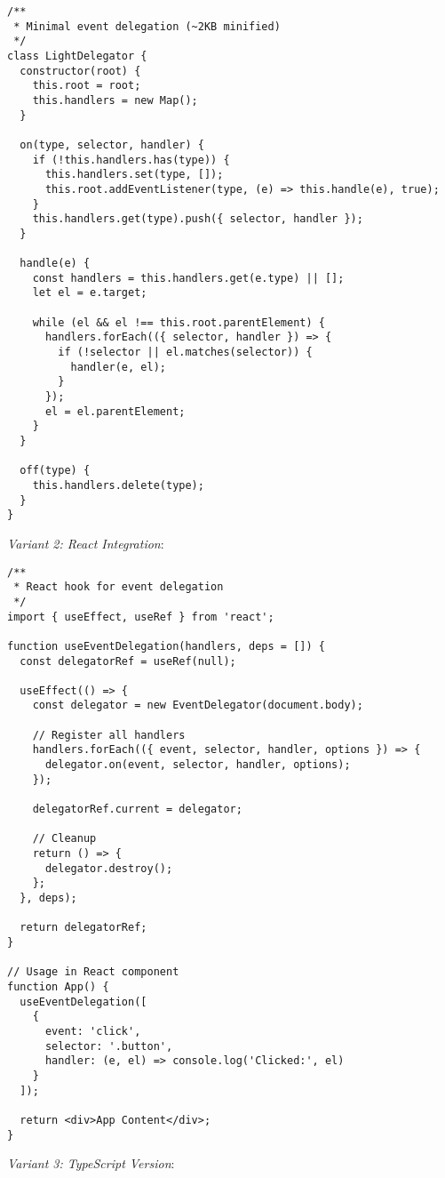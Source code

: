 \documentclass[11pt]{article}
\begin{document}
\begin{verbatim}
/**
 * Minimal event delegation (~2KB minified)
 */
class LightDelegator {
  constructor(root) {
    this.root = root;
    this.handlers = new Map();
  }
  
  on(type, selector, handler) {
    if (!this.handlers.has(type)) {
      this.handlers.set(type, []);
      this.root.addEventListener(type, (e) => this.handle(e), true);
    }
    this.handlers.get(type).push({ selector, handler });
  }
  
  handle(e) {
    const handlers = this.handlers.get(e.type) || [];
    let el = e.target;
    
    while (el && el !== this.root.parentElement) {
      handlers.forEach(({ selector, handler }) => {
        if (!selector || el.matches(selector)) {
          handler(e, el);
        }
      });
      el = el.parentElement;
    }
  }
  
  off(type) {
    this.handlers.delete(type);
  }
}
\end{verbatim}

\emph{Variant 2: React Integration}:

\begin{verbatim}
/**
 * React hook for event delegation
 */
import { useEffect, useRef } from 'react';

function useEventDelegation(handlers, deps = []) {
  const delegatorRef = useRef(null);
  
  useEffect(() => {
    const delegator = new EventDelegator(document.body);
    
    // Register all handlers
    handlers.forEach(({ event, selector, handler, options }) => {
      delegator.on(event, selector, handler, options);
    });
    
    delegatorRef.current = delegator;
    
    // Cleanup
    return () => {
      delegator.destroy();
    };
  }, deps);
  
  return delegatorRef;
}

// Usage in React component
function App() {
  useEventDelegation([
    {
      event: 'click',
      selector: '.button',
      handler: (e, el) => console.log('Clicked:', el)
    }
  ]);
  
  return <div>App Content</div>;
}
\end{verbatim}

\emph{Variant 3: TypeScript Version}:
\end{document}
